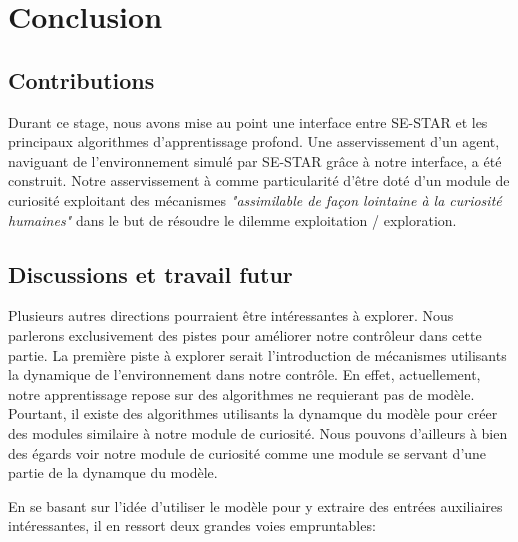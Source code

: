 \section{Conclusion}
\subsection{Contributions}

Durant ce stage, nous avons mise au point une interface entre SE-STAR et les principaux algorithmes d'apprentissage profond. Une asservissement d'un agent, naviguant de l'environnement simulé par SE-STAR grâce à notre interface, a été construit. Notre asservissement à comme particularité d'être doté d'un module de curiosité exploitant des mécanismes \emph{"assimilable de façon lointaine à la curiosité humaines"} dans le but de résoudre le dilemme exploitation / exploration.


\subsection{Discussions et travail futur}

Plusieurs autres directions pourraient être intéressantes à explorer. Nous parlerons exclusivement des pistes pour améliorer notre contrôleur dans cette partie. La première piste à explorer serait l'introduction de mécanismes utilisants la dynamique de l'environnement dans notre contrôle. En effet, actuellement, notre apprentissage repose sur des algorithmes ne requierant pas de modèle. Pourtant, il existe des algorithmes utilisants la dynamque du modèle pour créer des modules similaire à notre module de curiosité. Nous pouvons d'ailleurs à bien des égards voir notre module de curiosité comme une module se servant d'une partie de la dynamque du modèle. 

En se basant sur l'idée d'utiliser le modèle pour y extraire des entrées auxiliaires intéressantes, il en ressort deux grandes voies empruntables:

